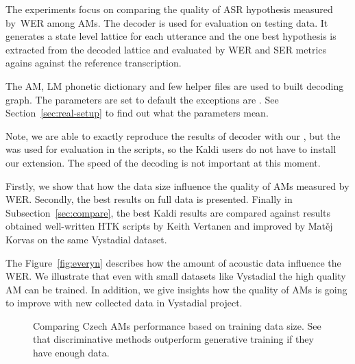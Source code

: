 The experiments focus on comparing the quality of ASR hypothesis measured by~\ac{WER} among \acp{AM}.
The  decoder is used for evaluation on testing data.
It generates a state level lattice for each utterance and the one best hypothesis is extracted from the decoded lattice and evaluated by \ac{WER} and \ac{SER} metrics agains against the reference transcription.

The \ac{AM}, \ac{LM} phonetic dictionary and few helper files are used to built  decoding graph.
The parameters are set to default the exceptions are . See Section~\ref{sec:real-setup} to find out what the parameters mean.

Note, we are able to exactly reproduce the results of  decoder with our , but the  was used for evaluation in the scripts, so the Kaldi users do not have to install our extension.
The speed of the decoding is not important at this moment. 

Firstly, we show that how the data size influence the quality of \acp{AM} measured by \ac{WER}.
Secondly,  the best results on full data is presented.
Finally in Subsection~\ref{sec:compare}, the best Kaldi results are compared against results obtained well-written \ac{HTK} scripts by Keith Vertanen and improved by Matěj Korvas \cite{korvas_2014} on the same Vystadial dataset.


The Figure~\ref{fig:everyn} describes how the amount of acoustic data influence the \ac{WER}.
We illustrate that even with small datasets like Vystadial the high quality \ac{AM} can be trained.
In addition, we give insights how the quality of \acp{AM} is going to improve with new collected data in Vystadial project.

\begin{figure}[!htp]
    \begin{center}
    \end{center}
    \caption{Comparing Czech \acp{AM} performance  based on training data size. See that discriminative methods outperform generative training if they have enough data.}
    \label{fig:am-deps} 
\end{figure}


